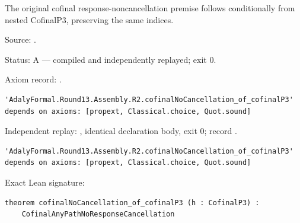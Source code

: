 \begin{theorem}[bp-582]
\label{bp-582}
\leanok
The original cofinal response-noncancellation premise follows conditionally from nested CofinalP3, preserving the same indices.

\par Source: \texttt{}.
\par Status: A — compiled and independently replayed; exit 0.
\par Axiom record: \texttt{}.
\begin{verbatim}
'AdalyFormal.Round13.Assembly.R2.cofinalNoCancellation_of_cofinalP3' depends on axioms: [propext, Classical.choice, Quot.sound]
\end{verbatim}
\par Independent replay: \texttt{}, identical declaration body, exit 0; record \texttt{}.
\begin{verbatim}
'AdalyFormal.Round13.Assembly.R2.cofinalNoCancellation_of_cofinalP3' depends on axioms: [propext, Classical.choice, Quot.sound]
\end{verbatim}
\par Exact Lean signature:
\begin{verbatim}
theorem cofinalNoCancellation_of_cofinalP3 (h : CofinalP3) :
    CofinalAnyPathNoResponseCancellation
\end{verbatim}
\end{theorem}

